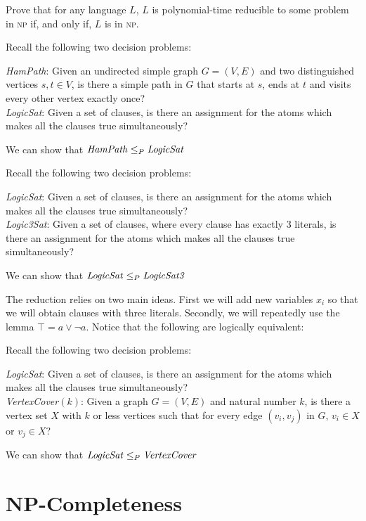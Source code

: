 \begin{example}
Prove that for any language $L$, $L$ is polynomial-time reducible to some problem
in \textsc{np} if, and only if, $L$ is in \textsc{np}.
\end{example}


\frmrule

\begin{example}
Recall the following two decision problems:

\textit{HamPath}: Given an undirected simple graph $G = (V,E)$ 
and two distinguished vertices $s, t \in V$, 
is there a simple path in $G$ that starts at $s$, ends at $t$ 
and visits every other vertex exactly once?\\
\textit{LogicSat}: Given a set of clauses, is there an 
assignment for the atoms which makes all the clauses true simultaneously?

We can show that $\text{\textit{HamPath}} \leq_P \text{\textit{LogicSat}}$
\end{example}

\frmrule

\begin{example}
Recall the following two decision problems:

\textit{LogicSat}: Given a set of clauses, is there an 
assignment for the atoms which makes all the clauses true simultaneously? \\
\textit{Logic3Sat}: Given a set of clauses, where every clause has exactly 3 literals, 
is there an assignment for the atoms which makes all the clauses true simultaneously?

We can show that $\text{\textit{LogicSat}} \leq_P \text{\textit{LogicSat3}}$

\frmrule

The reduction relies on two main ideas. 
First we will add new variables $x_i$ so that we will obtain clauses with three literals.
Secondly, we will repeatedly use the lemma $\top = a \vee \neg a$. 
Notice that the following are logically equivalent:



\end{example}


\begin{example}
Recall the following two decision problems:

\textit{LogicSat}: Given a set of clauses, is there an 
assignment for the atoms which makes all the clauses true simultaneously? \\
\textit{VertexCover}$(k)$: Given a graph $G = (V,E)$ and natural number $k$, 
is there a vertex set $X$ with $k$ or less vertices such that for 
every edge $(v_i, v_j)$ in $G$, $v_i \in X$ or $v_j \in X$?


We can show that $\text{\textit{LogicSat}} \leq_P \text{\textit{VertexCover}}$


\end{example}






\section{NP-Completeness}

